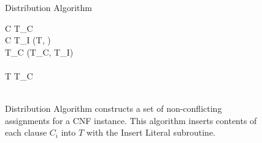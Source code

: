 
\begin{figure}[htbp]
\begin{center}

	\begin{pseudocode}{Distribution Algorithm}{\phi}
	
	\FOREACH {} C  \phi \DO
		\BEGIN 
				T_C \GETS \emptyset \\
			\FOREACH {} \ell {} C \DO
				\BEGIN
					T_I \GETS {}(T, \ell)\\
					T_C \GETS {}(T_C, T_I)\\
				\END\\
				T \GETS {}T_C\text{)} \\
		\END
	\\
	\end{pseudocode}

\caption{{\sc Distribution Algorithm} constructs a set of non-conflicting assignments for a CNF instance.  This algorithm inserts contents of each clause $C_i$ into $T$ with the {\sc Insert Literal} subroutine.}
\label{distributionAlgorithm}
\end{center}
\end{figure}

